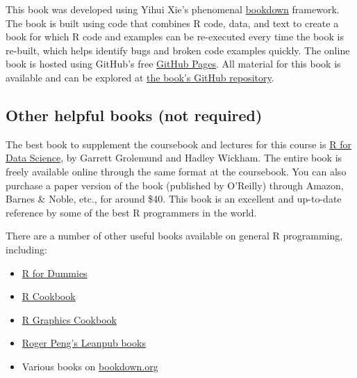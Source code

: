 \documentclass[]{book}
\providecommand{\tightlist}{%
  \setlength{\itemsep}{0pt}\setlength{\parskip}{0pt}}
\theoremstyle{definition}
\theoremstyle{definition}
\theoremstyle{definition}
\theoremstyle{remark}
\begin{document}
This book was developed using Yihui Xie's phenomenal
\href{https://bookdown.org}{bookdown} framework. The book is built using
code that combines R code, data, and text to create a book for which R
code and examples can be re-executed every time the book is re-built,
which helps identify bugs and broken code examples quickly. The online
book is hosted using GitHub's free
\href{https://pages.github.com}{GitHub Pages}. All material for this
book is available and can be explored at
\href{https://github.com/geanders/RProgrammingForResearch}{the book's
GitHub repository}.

\subsection{Other helpful books (not
required)}\label{other-helpful-books-not-required}

The best book to supplement the coursebook and lectures for this course
is \href{http://r4ds.had.co.nz}{R for Data Science}, by Garrett
Grolemund and Hadley Wickham. The entire book is freely available online
through the same format at the coursebook. You can also purchase a paper
version of the book (published by O'Reilly) through Amazon, Barnes \&
Noble, etc., for around \$40. This book is an excellent and up-to-date
reference by some of the best R programmers in the world.

There are a number of other useful books available on general R
programming, including:

\begin{itemize}
\tightlist
\item
  \href{https://colostate-primo.hosted.exlibrisgroup.com/primo-explore/fulldisplay?docid=01COLSU_ALMA51267598310003361\&context=L\&vid=01COLSU\&lang=en_US\&search_scope=Everything\&adaptor=Local\%20Search\%20Engine\&tab=default_tab\&query=any,contains,r\%20for\%20dummies\&sortby=rank\&offset=0}{R
  for Dummies}
\item
  \href{https://colostate-primo.hosted.exlibrisgroup.com/primo-explore/fulldisplay?docid=01COLSU_ALMA21203304500003361\&context=L\&vid=01COLSU\&lang=en_US\&search_scope=Everything\&adaptor=Local\%20Search\%20Engine\&tab=default_tab\&query=any,contains,r\%20cookbook\&sortby=rank\&offset=0}{R
  Cookbook}
\item
  \href{http://www.amazon.com/R-Graphics-Cookbook-Winston-Chang/dp/1449316956/ref=sr_1_1?ie=UTF8\&qid=1440997472\&sr=8-1\&keywords=r+graphics+cookbook}{R
  Graphics Cookbook}
\item
  \href{https://leanpub.com/u/rdpeng}{Roger Peng's Leanpub books}
\item
  Various books on \href{www.bookdown.org}{bookdown.org}
\end{itemize}
\end{document}
